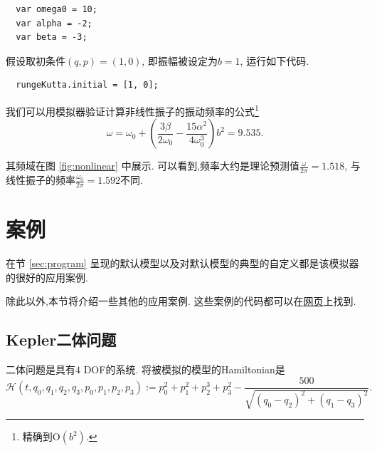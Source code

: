 \documentclass[12pt]{article}
\begin{document}
\begin{verbatim}
  var omega0 = 10;
  var alpha = -2;
  var beta = -3;
\end{verbatim}

假设取初条件$\left(q,p\right)=\left(1,0\right)$, 即振幅被设定为$b=1$, 运行如下代码.

\begin{verbatim}
  rungeKutta.initial = [1, 0];
\end{verbatim}

我们可以用模拟器验证计算非线性振子的振动频率的公式\cite[p. 87]{landau1976mechanics}\footnote{
  精确到$\mathrm O\left(b^2\right)$.
}
\begin{equation*}
  \omega=\omega_0+\left(\frac{3\beta}{2\omega_0}-\frac{15\alpha^2}{4\omega_0^3}\right)b^2=9.535.
\end{equation*}

其频域在图 \ref{fig:nonlinear} 中展示.
可以看到,频率大约是理论预测值$\frac\omega{2\pi}=1.518$,
与线性振子的频率$\frac{\omega_0}{2\pi}=1.592$不同.

\section{案例}
\label{sec:examples}

在节 \ref{sec:program} 呈现的默认模型以及对默认模型的典型的自定义都是该模拟器的很好的应用案例.

除此以外,本节将介绍一些其他的应用案例.
这些案例的代码都可以在\href{https://ulysseszh.github.io/rpg/mechsimul2/examples.html}{网页}上找到.

\subsection{Kepler二体问题}

二体问题是具有$4$ DOF的系统.
将被模拟的模型的Hamiltonian是
\begin{equation*}
  \mathcal H\left(t,q_0,q_1,q_2,q_3,p_0,p_1,p_2,p_3\right):=
  p_0^2+p_1^2+p_2^3+p_3^2-\frac{500}{\sqrt{\left(q_0-q_2\right)^2+\left(q_1-q_3\right)^2}}.
\end{equation*}
\end{document}
